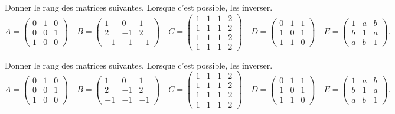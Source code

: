 \documentclass[a4paper, 11pt,reqno]{article}
\begin{document}
\begin{exercice}
Donner le rang des matrices suivantes. Lorsque c'est possible, les inverser.
$$A=\left(\begin{array}{rrr} 0&1&0\\ 0&0&1\\ 1&0&0  \end{array}\right)\quad B=\left(\begin{array}{lll} 1&0&1\\ 2&-1&2\\ -1&-1&-1  \end{array}\right)\quad
C=\left(\begin{array}{llll} 1&1&1&2\\ 1&1&1&2\\ 1&1&1&2\\ 1&1&1&2  \end{array}\right)\quad D=\left(\begin{array}{lll} 0&1&1\\ 1&0&1\\ 1&1&0  \end{array}\right)\quad E=\left(\begin{array}{lll} 1&a&b\\ b&1&a\\ a&b&1  \end{array}\right).$$
\end{exercice}
\begin{correction}
Donner le rang des matrices suivantes. Lorsque c'est possible, les inverser.
$$A=\left(\begin{array}{rrr} 0&1&0\\ 0&0&1\\ 1&0&0  \end{array}\right)\quad B=\left(\begin{array}{lll} 1&0&1\\ 2&-1&2\\ -1&-1&-1  \end{array}\right)\quad
C=\left(\begin{array}{llll} 1&1&1&2\\ 1&1&1&2\\ 1&1&1&2\\ 1&1&1&2  \end{array}\right)\quad D=\left(\begin{array}{lll} 0&1&1\\ 1&0&1\\ 1&1&0  \end{array}\right)\quad E=\left(\begin{array}{lll} 1&a&b\\ b&1&a\\ a&b&1  \end{array}\right).$$
\end{correction}
\end{document}
